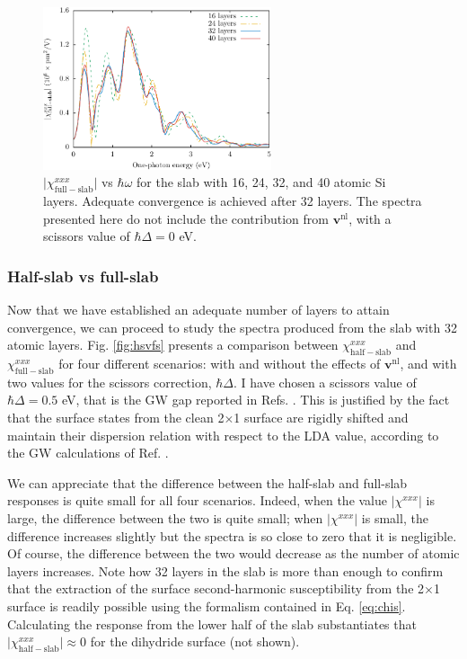 \begin{figure}[b]
\centering 
\includegraphics[width=0.6\textwidth]{content/figures/fig-Si2x1-layerconv}
\caption{$\vert\chi_{\mathrm{full-slab}}^{xxx}\vert$ vs $\hbar\omega$ for the
slab with 16, 24, 32, and 40 atomic Si layers. Adequate convergence is achieved
after 32 layers. The spectra presented here do not include the contribution from
$\mathbf{v}^{\mathrm{nl}}$, with a scissors value of $\hbar\Delta = 0$ eV.}
\label{fig:layersconv}
\end{figure}



\subsubsection{Half-slab vs full-slab}

Now that we have established an adequate number of layers to attain convergence,
we can proceed to study the spectra produced from the slab with 32 atomic
layers. Fig. \ref{fig:hsvfs} presents a comparison between
$\chi^{xxx}_{\mathrm{half-slab}}$ and $\chi^{xxx}_{\mathrm{full-slab}}$ for four
different scenarios: with and without the effects of $\mathbf{v}^\mathrm{nl}$,
and with two values for the scissors correction, $\hbar\Delta$. I have chosen a
scissors value of $\hbar\Delta=0.5$ eV, that is the GW gap reported in Refs.
\cite{rohlfingPRB95, garciaCPC01}. This is justified by the fact that the
surface states from the clean 2$\times$1 surface are rigidly shifted and
maintain their dispersion relation with respect to the LDA value, according to
the GW calculations of Ref.
\cite{rohlfingPRB95}.

We can appreciate that the difference between the half-slab and full-slab
responses is quite small for all four scenarios. Indeed, when the value
$\vert\chi^{xxx}\vert$ is large, the difference between the two is quite small;
when $\vert\chi^{xxx}\vert$ is small, the difference increases slightly but the
spectra is so close to zero that it is negligible. Of course, the difference
between the two would decrease as the number of atomic layers increases. Note
how 32 layers in the slab is more than enough to confirm that the extraction of
the surface second-harmonic susceptibility from the 2$\times$1 surface is
readily possible using the formalism contained in Eq. \eqref{eq:chis}.
Calculating the response from the lower half of the slab substantiates that
$\vert\chi^{xxx}_{\mathrm{half-slab}}\vert\approx 0$ for the dihydride surface
(not shown).

